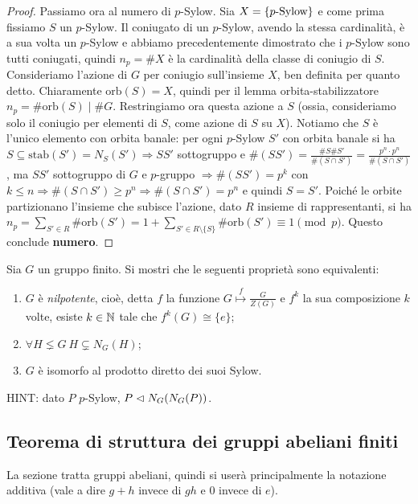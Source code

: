 \begin{proof}
    Passiamo ora al numero di $p$-Sylow. Sia $X = \left\{  p\text{-Sylow} \right\}$ e come prima fissiamo $S$ un $p$-Sylow. Il coniugato di un $p$-Sylow, avendo la stessa cardinalità, è a sua volta un $p$-Sylow e abbiamo precedentemente dimostrato che i $p$-Sylow sono tutti coniugati, quindi $n_p = \#X$ è la cardinalità della classe di coniugio di $S$. Consideriamo l'azione di $G$ per coniugio sull'insieme $X$, ben definita per quanto detto. Chiaramente $\text{orb}(S) = X$, quindi per il lemma orbita-stabilizzatore $n_p = \#\text{orb}(S) \mid \#G$. Restringiamo ora questa azione a $S$ (ossia, consideriamo solo il coniugio per elementi di $S$, come azione di $S$ su $X$). Notiamo che $S$ è l'unico elemento con orbita banale: per ogni $p$-Sylow $S'$ con orbita banale si ha $S \subseteq \text{stab}(S') = N_S(S') \Rightarrow SS'$ sottogruppo e $\#(SS') = \frac{\#S \#S'}{\#(S \cap S')} = \frac{p^n \cdot p^n}{\#(S \cap S')}$, ma $SS'$ sottogruppo di $G$ e $p$-gruppo $\Rightarrow \#(SS') = p^k$ con $k\leq n \Rightarrow \#(S\cap S') \geq p^n \Rightarrow \#(S\cap S') = p^n$ e quindi $S = S'$. Poiché le orbite partizionano l'insieme che subisce l'azione, dato $R$ insieme di rappresentanti, si ha $n_p = \sum_{S' \in R} \#\text{orb}(S') = 1 + \sum_{S' \in R\setminus\{S\}} \#\text{orb}(S') \equiv 1 \pmod{p}$. Questo conclude \textbf{numero}.
\end{proof}

\begin{exercise}
    Sia $G$ un gruppo finito. Si mostri che le seguenti proprietà sono equivalenti:
    \begin{enumerate}[label=$(\roman*)$]
        \item $G$ è \emph{nilpotente}, cioè, detta $f$ la funzione $G \overset{f}{\mapsto} \frac{G}{Z(G)}$ e $f^{k}$ la sua composizione $k$ volte, esiste $k \in \mathbb{N}$ tale che $f^k(G) \cong \{e\}$;
        \item $\forall H \lneq G \ H \subsetneq N_G(H)$;
        \item $G$ è isomorfo al prodotto diretto dei suoi Sylow.
    \end{enumerate}
    \tiny{HINT: dato $P$ $p$-Sylow, $P \vartriangleleft N_G(N_G(P))$.}
\end{exercise}

\subsection{Teorema di struttura dei gruppi abeliani finiti}
La sezione tratta gruppi abeliani, quindi si userà principalmente la notazione additiva (vale a dire $g+h$ invece di $gh$ e $0$ invece di $e$).

